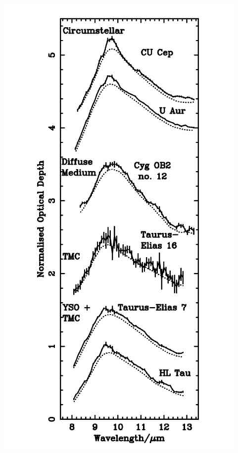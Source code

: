 \begin{frame}
\begin{minipage}[t]{0.3\textwidth}
\begin{center}
\includegraphics[width=\textwidth,height=!]{./D/bowey_obs_taus.jpg}
    \end{center}
\end{minipage}
\begin{minipage}[t]{0.3\textwidth}
\vspace{-1.0cm}
  \begin{center}

\end{center}
\end{minipage}
\end{frame}
